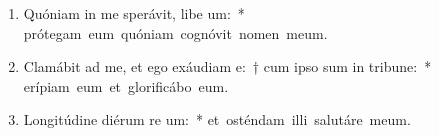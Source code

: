 \begin{flushleft}
\begin{enumerate}[leftmargin=*]
\item Quóniam in me sperávit, libe um:~* \mbox{prótegam eum quóniam cognóvit nomen meum.}

\item Clamábit ad me, et ego exáudiam e:~† cum ipso sum in tribune:~* \mbox{erípiam eum et glorificábo eum.}

\item Longitúdine diérum re um:~* \mbox{et osténdam illi salutáre meum.}


\end{enumerate}
\end{flushleft}

